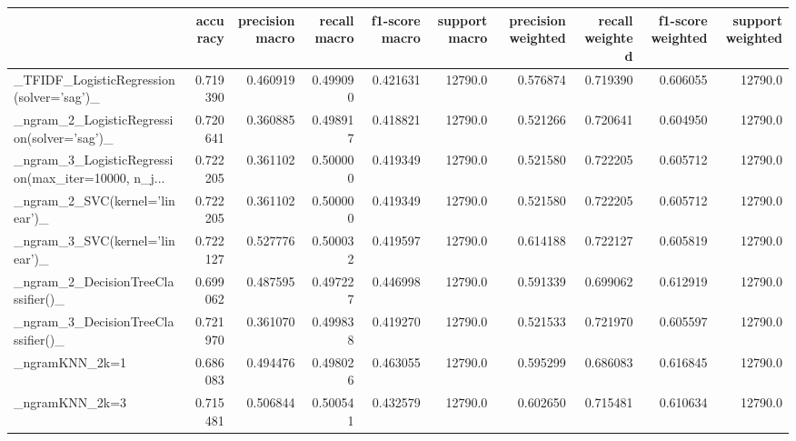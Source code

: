 \begin{tabular}{lrrrrrrrrr}
\toprule
{} &  accuracy &  precision macro &  recall macro &  f1-score macro &  support macro &  precision weighted &  recall weighted &  f1-score weighted &  support weighted \\
\midrule
\_TFIDF\_LogisticRegression(solver='sag')\_           &  0.719390 &         0.460919 &      0.499090 &        0.421631 &        12790.0 &            0.576874 &         0.719390 &           0.606055 &           12790.0 \\
\_ngram\_2\_LogisticRegression(solver='sag')\_         &  0.720641 &         0.360885 &      0.498917 &        0.418821 &        12790.0 &            0.521266 &         0.720641 &           0.604950 &           12790.0 \\
\_ngram\_3\_LogisticRegression(max\_iter=10000, n\_j... &  0.722205 &         0.361102 &      0.500000 &        0.419349 &        12790.0 &            0.521580 &         0.722205 &           0.605712 &           12790.0 \\
\_ngram\_2\_SVC(kernel='linear')\_                     &  0.722205 &         0.361102 &      0.500000 &        0.419349 &        12790.0 &            0.521580 &         0.722205 &           0.605712 &           12790.0 \\
\_ngram\_3\_SVC(kernel='linear')\_                     &  0.722127 &         0.527776 &      0.500032 &        0.419597 &        12790.0 &            0.614188 &         0.722127 &           0.605819 &           12790.0 \\
\_ngram\_2\_DecisionTreeClassifier()\_                 &  0.699062 &         0.487595 &      0.497227 &        0.446998 &        12790.0 &            0.591339 &         0.699062 &           0.612919 &           12790.0 \\
\_ngram\_3\_DecisionTreeClassifier()\_                 &  0.721970 &         0.361070 &      0.499838 &        0.419270 &        12790.0 &            0.521533 &         0.721970 &           0.605597 &           12790.0 \\
\_ngramKNN\_2k=1                                     &  0.686083 &         0.494476 &      0.498026 &        0.463055 &        12790.0 &            0.595299 &         0.686083 &           0.616845 &           12790.0 \\
\_ngramKNN\_2k=3                                     &  0.715481 &         0.506844 &      0.500541 &        0.432579 &        12790.0 &            0.602650 &         0.715481 &           0.610634 &           12790.0 \\

\end{tabular}
